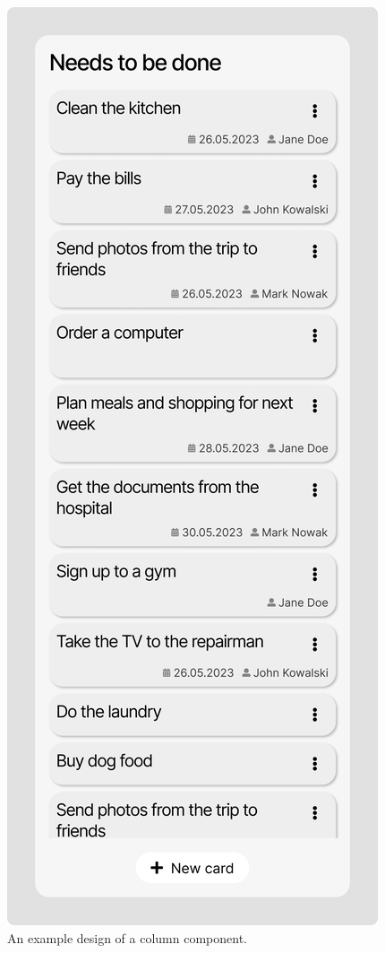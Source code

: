 \begin{figure}
    \hfill
    \begin{minipage}{0.45\textwidth}
        \centering
        \includegraphics[height=0.4\textheight]{./3-research-methodology/column-component}
        \caption{An example design of a column component.}
        \label{fig:3-4-column-component}
    \end{minipage}
\end{figure}


